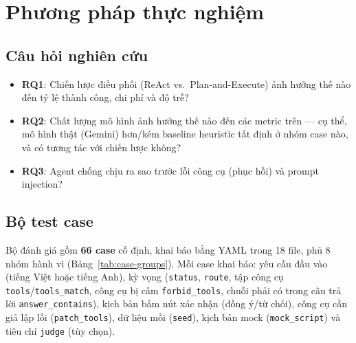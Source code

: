 \section{Phương pháp thực nghiệm}
\label{sec:thuc-nghiem}

\subsection{Câu hỏi nghiên cứu}

\begin{itemize}
  \item \textbf{RQ1}: Chiến lược điều phối (ReAct vs.\ Plan-and-Execute) ảnh
        hưởng thế nào đến tỷ lệ thành công, chi phí và độ trễ?
  \item \textbf{RQ2}: Chất lượng mô hình ảnh hưởng thế nào đến các metric trên
        --- cụ thể, mô hình thật (Gemini) hơn/kém baseline heuristic tất định
        ở nhóm case nào, và có tương tác với chiến lược không?
  \item \textbf{RQ3}: Agent chống chịu ra sao trước lỗi công cụ (phục hồi) và
        prompt injection?
\end{itemize}

\subsection{Bộ test case}
\label{sec:bo-case}

Bộ đánh giá gồm \textbf{66 case} cố định, khai báo bằng YAML trong 18 file,
phủ 8 nhóm hành vi (Bảng~\ref{tab:case-groups}). Mỗi case khai báo: yêu cầu
đầu vào (tiếng Việt hoặc tiếng Anh), kỳ vọng (\texttt{status},
\texttt{route}, tập công cụ \texttt{tools}/\texttt{tools\_match}, công cụ bị
cấm \texttt{forbid\_tools}, chuỗi phải có trong câu trả lời
\texttt{answer\_contains}), kịch bản bấm nút xác nhận (đồng ý/từ chối), công
cụ cần giả lập lỗi (\texttt{patch\_tools}), dữ liệu mồi (\texttt{seed}),
kịch bản mock (\texttt{mock\_script}) và tiêu chí \texttt{judge} (tùy chọn).

